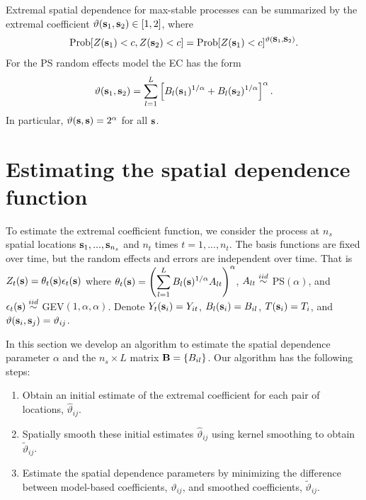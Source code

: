 \documentclass[11pt]{article}
\begin{document}
Extremal spatial dependence for max-stable processes can be summarized by the extremal coefficient \citep[EC]{Schlather2003} $\vartheta(\mbox{\bf s}_1, \mbox{\bf s}_2)\in[1,2]$, where
\begin{align} \label{ebeq:ECdev}
  \mbox{Prob}[Z(\mbox{\bf s}_1)<c, Z(\mbox{\bf s}_2)<c] = \mbox{Prob}[Z(\mbox{\bf s}_1)<c]^{\vartheta(\mbox{\bf s}_1,\mbox{\bf s}_2)}.
\end{align}
For the PS random effects model the EC has the form
\begin{align} \label{ebeq:EC}
   \vartheta(\mbox{\bf s}_1,\mbox{\bf s}_2) = \sum_{l=1}^L \left[B_{l}(\mbox{\bf s}_1)^{1/\alpha}+B_{l}(\mbox{\bf s}_2)^{1/\alpha}\right]^\alpha.
\end{align}
In particular, $\vartheta(\mbox{\bf s},\mbox{\bf s}) = 2^{\alpha}$ for all $\mbox{\bf s}$.

\section{Estimating the spatial dependence function}\label{ebs:estimation}
To estimate the extremal coefficient function, we consider the process at $n_s$ spatial locations $\mbox{\bf s}_1,...,\mbox{\bf s}_{n_s}$ and $n_t$ times $t=1,...,n_t$.
The basis functions are fixed over time, but the random effects and errors are independent over time.
That is $Z_t(\mbox{\bf s}) = \theta_t(\mbox{\bf s}) \epsilon_t(\mbox{\bf s})$ where $\theta_t(\mbox{\bf s}) = \left(\displaystyle \sum_{l=1}^L B_{l}(\mbox{\bf s})^{1/\alpha}A_{lt}\right)^{\alpha}$, $A_{lt} \stackrel{iid}{\sim}$ PS$(\alpha)$, and $\epsilon_t(\mbox{\bf s}) \stackrel{iid}{\sim}$ GEV$(1, \alpha, \alpha)$.
Denote $Y_t(\mbox{\bf s}_i) = Y_{it}$, $B_l(\mbox{\bf s}_i) = B_{il}$, $T(\mbox{\bf s}_i)=T_i$, and $\vartheta(\mbox{\bf s}_i,\mbox{\bf s}_j) = \vartheta_{ij}$.

In this section we develop an algorithm to estimate the spatial dependence parameter $\alpha$ and the $n_s\times L$ matrix $\mbox{\bf B} = \{B_{il}\}$.
Our algorithm has the following steps:
\begin{enumerate}[(1)]
  \item Obtain an initial estimate of the extremal coefficient for each pair of locations, ${\hat \vartheta}_{ij}$.
  \item Spatially smooth these initial estimates ${\hat \vartheta}_{ij}$ using kernel smoothing to obtain ${\tilde \vartheta}_{ij}$.
  \item Estimate the spatial dependence parameters by minimizing the difference between model-based coefficients, $\vartheta_{ij}$, and smoothed coefficients, ${\tilde \vartheta}_{ij}$.
\end{enumerate}
\end{document}
